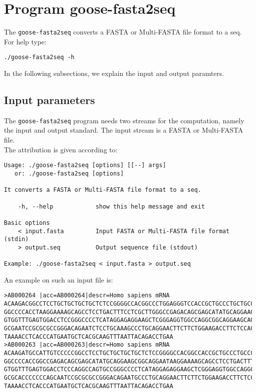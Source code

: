 \section{Program goose-fasta2seq}
The \texttt{goose-fasta2seq} converts a FASTA or Multi-FASTA file format to a seq.\\
For help type:
\begin{lstlisting}
./goose-fasta2seq -h
\end{lstlisting}
In the following subsections, we explain the input and output paramters.

\subsection*{Input parameters}

The \texttt{goose-fasta2seq} program needs two streams for the computation,
namely the input and output standard. The input stream is a FASTA or Multi-FASTA file.\\
The attribution is given according to:
\begin{lstlisting}
Usage: ./goose-fasta2seq [options] [[--] args]
   or: ./goose-fasta2seq [options]

It converts a FASTA or Multi-FASTA file format to a seq.

    -h, --help            show this help message and exit

Basic options
    < input.fasta         Input FASTA or Multi-FASTA file format (stdin)
    > output.seq          Output sequence file (stdout)

Example: ./goose-fasta2seq < input.fasta > output.seq
\end{lstlisting}
An example on such an input file is:
\begin{lstlisting}
>AB000264 |acc=AB000264|descr=Homo sapiens mRNA 
ACAAGACGGCCTCCTGCTGCTGCTGCTCTCCGGGGCCACGGCCCTGGAGGGTCCACCGCTGCCCTGCTGCCATTGTCCCC
GGCCCCACCTAAGGAAAAGCAGCCTCCTGACTTTCCTCGCTTGGGCCGAGACAGCGAGCATATGCAGGAAGCGGCAGGAA
GTGGTTTGAGTGGACCTCCGGGCCCCTCATAGGAGAGGAAGCTCGGGAGGTGGCCAGGCGGCAGGAAGCAGGCCAGTGCC
GCGAATCCGCGCGCCGGGACAGAATCTCCTGCAAAGCCCTGCAGGAACTTCTTCTGGAAGACCTTCTCCACCCCCCCAGC
TAAAACCTCACCCATGAATGCTCACGCAAGTTTAATTACAGACCTGAA
>AB000263 |acc=AB000263|descr=Homo sapiens mRNA 
ACAAGATGCCATTGTCCCCCGGCCTCCTGCTGCTGCTGCTCTCCGGGGCCACGGCCACCGCTGCCCTGCCCCTGGAGGGT
GGCCCCACCGGCCGAGACAGCGAGCATATGCAGGAAGCGGCAGGAATAAGGAAAAGCAGCCTCCTGACTTTCCTCGCTTG
GTGGTTTGAGTGGACCTCCCAGGCCAGTGCCGGGCCCCTCATAGGAGAGGAAGCTCGGGAGGTGGCCAGGCGGCAGGAAG
GCGCACCCCCCCAGCAATCCGCGCGCCGGGACAGAATGCCCTGCAGGAACTTCTTCTGGAAGACCTTCTCCTCCTGCAAA
TAAAACCTCACCCATGAATGCTCACGCAAGTTTAATTACAGACCTGAA
\end{lstlisting}

